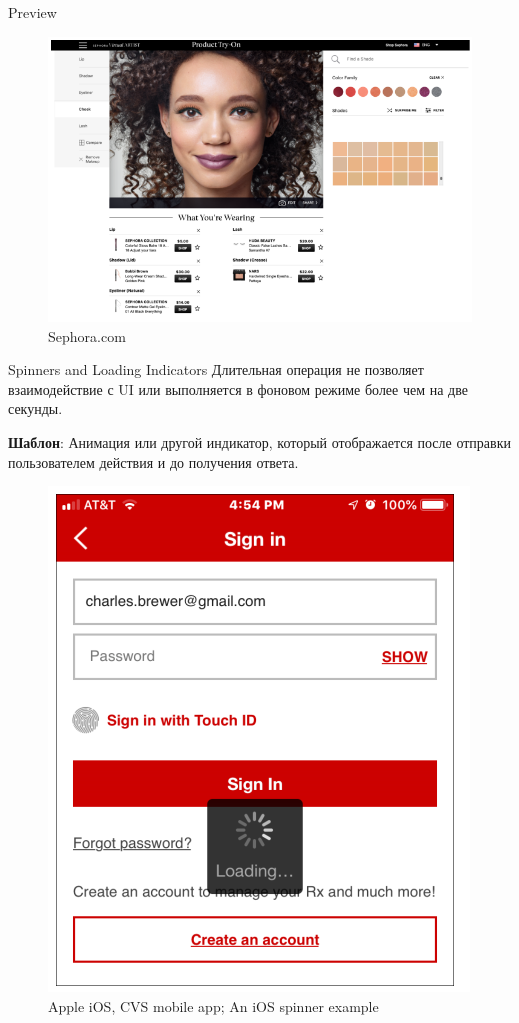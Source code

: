 \documentclass{beamer}
\begin{document}
\begin{frame}[t]{Preview}
	\begin{figure}[h]
		\centering
		\includegraphics[scale=0.5]{images/lec08-pic18.png}
		\caption{Sephora.com}
	\end{figure}
\end{frame}

\begin{frame}[t]{Spinners and Loading Indicators}
	Длительная операция не позволяет взаимодействие с UI или выполняется в фоновом режиме более чем на две секунды.
	
	\textbf{Шаблон}: Анимация или другой индикатор, который отображается после отправки пользователем действия и до получения ответа.
	\begin{figure}[h]
		\centering
		\includegraphics[scale=0.4]{images/lec08-pic19.png}
		\caption{Apple iOS, CVS mobile app; An iOS spinner example}
	\end{figure}
\end{frame}
\end{document}
